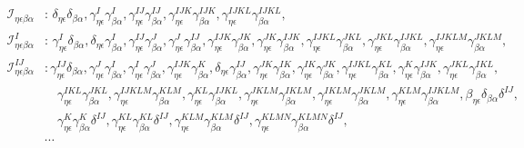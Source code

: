 \documentclass[11pt]{article}
\begin{document}
\begin{small}
\begin{equation}
\begin{split}
    \mathcal{I}_{\eta \epsilon\beta\alpha}&: \, {\delta _{\eta \epsilon }\delta _{\beta \alpha }, \gamma _{\eta \epsilon }^{I}\gamma _{\beta \alpha }^{I}, \gamma _{\eta \epsilon }^{IJ}\gamma _{\beta \alpha }^{IJ}, \gamma _{\eta \epsilon }^{IJK}\gamma _{\beta \alpha }^{IJK}, \gamma _{\eta \epsilon }^{IJKL}\gamma _{\beta \alpha }^{IJKL}}, \\
    \mathcal{I}^I_{\eta \epsilon\beta\alpha}&: \,{\gamma _{\eta \epsilon }^{I}\delta _{\beta \alpha }, \delta _{\eta \epsilon }\gamma _{\beta \alpha }^{I}, \gamma _{\eta \epsilon }^{IJ}\gamma _{\beta \alpha }^{J}, \gamma _{\eta \epsilon }^{J}\gamma _{\beta \alpha }^{IJ}, \gamma _{\eta \epsilon }^{IJK}\gamma _{\beta \alpha }^{JK}, \gamma _{\eta \epsilon }^{JK}\gamma _{\beta \alpha }^{IJK}, \gamma _{\eta \epsilon }^{IJKL}\gamma _{\beta \alpha }^{JKL}, \gamma _{\eta \epsilon }^{JKL}\gamma _{\beta \alpha }^{IJKL}, \gamma _{\eta \epsilon }^{IJKLM}\gamma _{\beta \alpha }^{JKLM}}, \\
    \mathcal{I}^{IJ}_{\eta \epsilon\beta\alpha}&: \gamma _{\eta \epsilon }^{IJ}\delta _{\beta \alpha }, \gamma _{\eta \epsilon }^{J}\gamma _{\beta \alpha }^{I}, \gamma _{\eta \epsilon }^{I}\gamma _{\beta \alpha }^{J}, \gamma _{\eta \epsilon }^{IJK}\gamma _{\beta \alpha }^{K}, \delta _{\eta \epsilon } \gamma _{\beta \alpha }^{IJ}, \gamma _{\eta \epsilon }^{JK}\gamma _{\beta \alpha }^{IK}, \gamma _{\eta \epsilon }^{IK}\gamma _{\beta \alpha }^{JK}, \gamma _{\eta \epsilon }^{IJKL}\gamma _{\beta \alpha }^{KL}, \gamma _{\eta \epsilon }^{K}\gamma _{\beta \alpha }^{IJK}, \gamma _{\eta \epsilon }^{JKL}\gamma _{\beta \alpha }^{IKL},\\
    &\quad \gamma _{\eta \epsilon }^{IKL}\gamma _{\beta \alpha }^{JKL}, \gamma _{\eta \epsilon }^{IJKLM}\gamma _{\beta \alpha }^{KLM}, \gamma _{\eta \epsilon }^{KL}\gamma _{\beta \alpha }^{IJKL}, \gamma _{\eta \epsilon }^{JKLM}\gamma _{\beta \alpha }^{IKLM}, \gamma _{\eta \epsilon }^{IKLM}\gamma _{\beta \alpha }^{JKLM}, \gamma _{\eta \epsilon }^{KLM}\gamma _{\beta \alpha }^{IJKLM}, \beta _{\eta \epsilon }\delta _{\beta \alpha }\delta ^{IJ},\\
    &\quad \gamma _{\eta \epsilon }^{K}\gamma _{\beta \alpha }^{K}\delta ^{IJ}, \gamma _{\eta \epsilon }^{KL}\gamma _{\beta \alpha }^{KL}\delta ^{IJ}, \gamma _{\eta \epsilon }^{KLM}\gamma _{\beta \alpha }^{KLM}\delta ^{IJ}, \gamma _{\eta \epsilon }^{KLMN}\gamma _{\beta \alpha }^{KLMN}\delta ^{IJ}, \\
    & \cdots
\end{split}
\end{equation}
\end{small}
\end{document}
